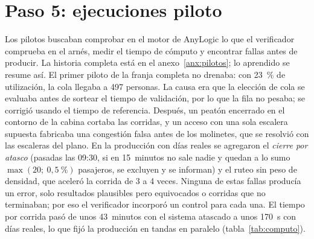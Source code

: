 \section{Paso 5: ejecuciones piloto}
\label{sec:paso5-pilotos}

Los pilotos buscaban comprobar en el motor de AnyLogic lo que el verificador comprueba en el arnés, medir el
tiempo de cómputo y encontrar fallas antes de producir. La historia completa está en el anexo~\ref{anx:pilotos};
lo aprendido se resume así. El primer piloto de la franja completa no drenaba: con 23~\% de utilización, la cola
llegaba a 497 personas. La causa era que la elección de cola se evaluaba antes de sortear el tiempo de
validación, por lo que la fila no pesaba; se corrigió usando el tiempo de referencia. Después, un peatón
encerrado en el contorno de la cabina cortaba las corridas, y un acceso con una sola escalera supuesta fabricaba
una congestión falsa antes de los molinetes, que se resolvió con las escaleras del plano. En la producción con
días reales se agregaron el \emph{cierre por atasco} (pasadas las 09:30, si en 15~minutos no sale nadie y quedan
a lo sumo $\max(20;\ 0{,}5~\%)$ pasajeros, se excluyen y se informan) y el ruteo sin peso de densidad, que
aceleró la corrida de 3 a 4 veces. Ninguna de estas fallas producía un error, solo resultados plausibles pero
equivocados o corridas que no terminaban; por eso el verificador incorporó un control para cada una. El tiempo
por corrida pasó de unos 43~minutos con el sistema atascado a unos 170~s con días reales, lo que fijó la
producción en tandas en paralelo (tabla~\ref{tab:computo}).
